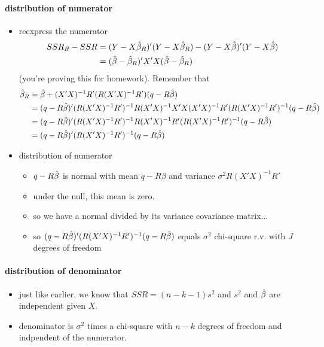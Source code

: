 \paragraph{distribution of numerator}
\begin{itemize}
\item reexpress the numerator
  \begin{align*}
    SSR_R - SSR
    &= (Y - X\hat{\beta}_R)'(Y - X\hat{\beta}_R) - (Y - X\hat{\beta})'(Y - X\hat{\beta}) \\
    &= (\hat{\beta} - \hat{\beta}_R)'X'X(\hat{\beta} - \hat{\beta}_R)
  \end{align*}
  (you're proving this for homework).  Remember that
  \begin{align*}
    \hat{\beta}_R &= \hat{\beta} + (X'X)^{-1} R'(R(X'X)^{-1}R')(q - R\hat{\beta}) \\
    &= (q - R\hat{\beta})' (R(X'X)^{-1}R')^{-1} R(X'X)^{-1}X'X(X'X)^{-1}R' (R(X'X)^{-1}R')^{-1} (q - R\hat{\beta}) \\
    &= (q - R\hat{\beta})' (R(X'X)^{-1}R')^{-1} R(X'X)^{-1} R'(R(X'X)^{-1}R')^{-1} (q - R\hat{\beta}) \\
    &= (q - R\hat{\beta})' (R(X'X)^{-1}R')^{-1} (q - R\hat{\beta})
  \end{align*}
\item distribution of numerator
\begin{itemize}
\item $q - R\hat{\beta}$ is normal with mean $q - R\beta$ and variance $\sigma^2
  R(X'X)^{-1}R'$
\item under the null, this mean is zero.
\item so we have a normal divided by its variance covariance matrix...
\item so $(q - R\hat{\beta})'(R(X'X)^{-1}R')^{-1}(q - R\hat{\beta})$ equals $\sigma^2$
  chi-square r.v. with $J$ degrees of freedom
\end{itemize}
\end{itemize}

\paragraph{distribution of denominator}
\begin{itemize}
\item just like earlier, we know that $SSR = (n-k-1) s^2$ and $s^2$
         and $\hat{\beta}$ are independent given $X$.
\item denominator is $\sigma^2$ times a chi-square with $n-k$
         degrees of freedom and indpendent of the numerator.
\end{itemize}

